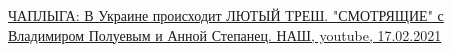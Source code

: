  
 
 
 
 

\href{https://www.youtube.com/watch?v=ioDMH8m7cQY}{%
ЧАПЛЫГА: В Украине происходит ЛЮТЫЙ ТРЕШ. "СМОТРЯЩИЕ" с Владимиром Полуевым и Анной Степанец. НАШ,%
youtube, 17.02.2021%
}
